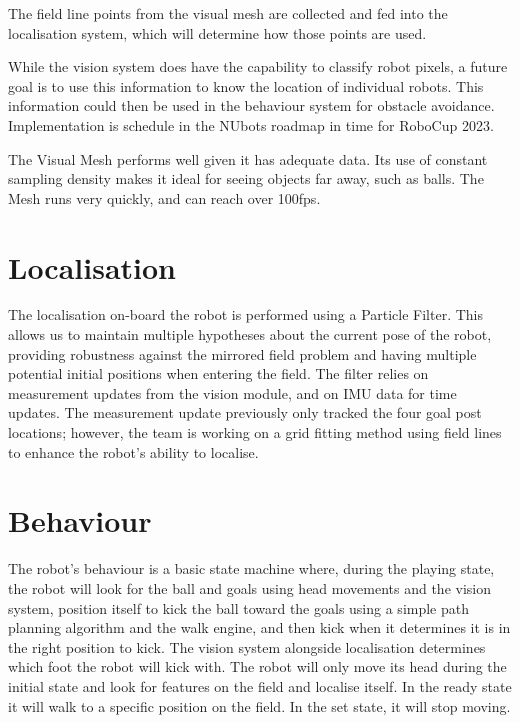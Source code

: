 \documentclass{llncs}
\begin{document}
The field line points from the visual mesh are collected and fed into the localisation system, which will determine how those points are used.

While the vision system does have the capability to classify robot pixels, a future goal is to use this information to know the location of individual robots. This information could then be used in the behaviour system for obstacle avoidance. Implementation is schedule in the NUbots roadmap in time for RoboCup 2023. 

The Visual Mesh performs well given it has adequate data. Its use of constant sampling density makes it ideal for seeing objects far away, such as balls. The Mesh runs very quickly, and can reach over 100fps. 

\section{Localisation}


The localisation on-board the robot is performed using a Particle Filter. This allows us to maintain multiple hypotheses about the current pose of the robot, providing robustness against the mirrored field problem and having multiple potential initial positions when entering the field. The filter relies on measurement updates from the vision module, and on IMU data for time updates. The measurement update previously only tracked the four goal post locations; however, the team is working on a grid fitting method using field lines to enhance the robot's ability to localise.

\medskip

\section{Behaviour}


The robot's behaviour is a basic state machine where, during the playing state, the robot will look for the ball and goals using head movements and the vision system, position itself to kick the ball toward the goals using a simple path planning algorithm and the walk engine, and then kick when it determines it is in the right position to kick. The vision system alongside localisation determines which foot the robot will kick with. The robot will only move its head during the initial state and look for features on the field and localise itself. In the ready state it will walk to a specific position on the field. In the set state, it will stop moving.
\end{document}
